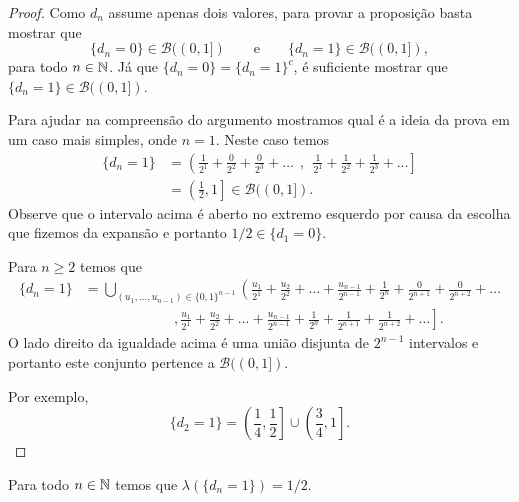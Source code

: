 \begin{proof}
Como $d_n$ assume apenas dois valores, 
para provar a proposição basta mostrar 
que 
	\[
		\{d_n=0\}\in\mathscr{B}((0,1])
		\qquad
		\text{e}
		\qquad
		\{d_n=1\}\in\mathscr{B}((0,1]),
	\]
para todo $n\in\mathbb{N}$.
Já que $\{d_n=0\} = \{d_n=1\}^c$, é suficiente
mostrar que $\{d_n=1\}\in \mathscr{B}((0,1])$.



Para ajudar na compreensão do argumento mostramos 
qual é a ideia da prova em um 
caso mais simples, onde $n=1$. Neste caso 
temos 
	\begin{align*}
		\{d_n=1\}
		&=
		\left(
		\frac{1}{2^1}+\frac{0}{2^2}+\frac{0}{2^3}+\ldots
		\right.
		\ \ \mathbf{,} \ \ 
		\left.
		\frac{1}{2^1}+\frac{1}{2^2}+\frac{1}{2^3}+\ldots
		\right]
		\\[0.3cm]
		&=
		\left(\frac{1}{2},1\right]
		\in \mathscr{B}((0,1]).
	\end{align*}
Observe que o intervalo acima é aberto no extremo esquerdo
por causa da escolha que fizemos da expansão e portanto 
$1/2\in \{d_1=0\}$.

Para $n\geq 2$ temos que 
	\begin{align*}
		\{d_n=1\}
		&=
		\bigcup_{(u_1,\ldots,u_{n-1})\in\{0,1\}^{n-1}}
		\left(
		\frac{u_1}{2^1}+\frac{u_2}{2^2}+\ldots+\frac{u_{n-1}}{2^{n-1}}+\frac{1}{2^{n}}
		+\frac{0}{2^{n+1}}+\frac{0}{2^{n+2}}+
		\ldots
		\right.
		\\
		&\qquad\qquad\qquad
		\ \ \mathbf{,} 
		\left.
		\frac{u_1}{2^1}+\frac{u_2}{2^2}+\ldots+\frac{u_{n-1}}{2^{n-1}}+\frac{1}{2^{n}}
		+\frac{1}{2^{n+1}}+\frac{1}{2^{n+2}}+
		\ldots
		\right].
	\end{align*}
O lado direito da igualdade acima é uma união 
disjunta de $2^{n-1}$ intervalos e portanto este
conjunto pertence a $\mathscr{B}((0,1])$.

Por exemplo, 
	\[
	\{d_2=1\} 
	= \left( \frac{1}{4},\frac{1}{2} \right]
	\cup 
	\left( \frac{3}{4},1  \right].
	\]
\end{proof}




\begin{proposicao}
	Para todo $n\in\mathbb{N}$ temos que $\lambda(\{d_n=1\})=1/2$.
\end{proposicao}



